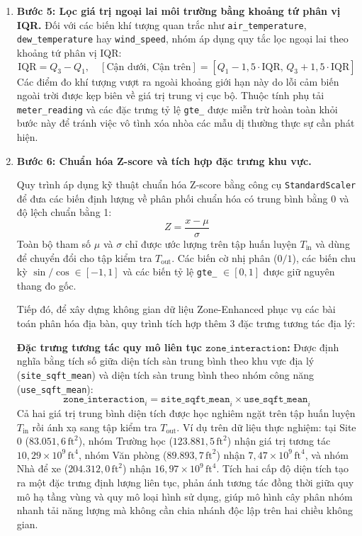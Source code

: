 \begin{enumerate}
    \item \textbf{Bước 5: Lọc giá trị ngoại lai môi trường bằng khoảng tứ phân vị IQR.}
    Đối với các biến khí tượng quan trắc như \texttt{air\_temperature}, \texttt{dew\_temperature} hay \texttt{wind\_speed}, nhóm áp dụng quy tắc lọc ngoại lai theo khoảng tứ phân vị IQR:
    \begin{equation*}
        \text{IQR} = Q_3 - Q_1, \quad [\text{Cận dưới}, \, \text{Cận trên}] = [Q_1 - 1{,}5 \cdot \text{IQR}, \, Q_3 + 1{,}5 \cdot \text{IQR}]
    \end{equation*}
    Các điểm đo khí tượng vượt ra ngoài khoảng giới hạn này do lỗi cảm biến ngoài trời được kẹp biên về giá trị trung vị cục bộ. Thuộc tính phụ tải \texttt{meter\_reading} và các đặc trưng tỷ lệ \texttt{gte\_} được miễn trừ hoàn toàn khỏi bước này để tránh việc vô tình xóa nhòa các mẫu dị thường thực sự cần phát hiện.

    \item \textbf{Bước 6: Chuẩn hóa Z-score và tích hợp đặc trưng khu vực.}
    
    Quy trình áp dụng kỹ thuật chuẩn hóa Z-score bằng công cụ \texttt{StandardScaler} để đưa các biến định lượng về phân phối chuẩn hóa có trung bình bằng 0 và độ lệch chuẩn bằng 1:
    \begin{equation*}
        Z = \frac{x - \mu}{\sigma}
    \end{equation*}
    Toàn bộ tham số $\mu$ và $\sigma$ chỉ được ước lượng trên tập huấn luyện $T_{\text{in}}$ và dùng để chuyển đổi cho tập kiểm tra $T_{\text{out}}$. Các biến cờ nhị phân ($0/1$), các biến chu kỳ $\sin/\cos \in [-1, 1]$ và các biến tỷ lệ \texttt{gte\_} $\in [0, 1]$ được giữ nguyên thang đo gốc.
    
    Tiếp đó, để xây dựng không gian dữ liệu Zone-Enhanced phục vụ các bài toán phân hóa địa bàn, quy trình tích hợp thêm 3 đặc trưng tương tác địa lý:
    
    \textbf{Đặc trưng tương tác quy mô liên tục $\texttt{zone\_interaction}$:} Được định nghĩa bằng tích số giữa diện tích sàn trung bình theo khu vực địa lý (\texttt{site\_sqft\_mean}) và diện tích sàn trung bình theo nhóm công năng (\texttt{use\_sqft\_mean}):
    \begin{equation*}
        \texttt{zone\_interaction}_i = \texttt{site\_sqft\_mean}_i \times \texttt{use\_sqft\_mean}_i
    \end{equation*}
    Cả hai giá trị trung bình diện tích được học nghiêm ngặt trên tập huấn luyện $T_{\text{in}}$ rồi ánh xạ sang tập kiểm tra $T_{\text{out}}$. Ví dụ trên dữ liệu thực nghiệm: tại Site 0 ($83.051{,}6\,\text{ft}^2$), nhóm Trường học ($123.881{,}5\,\text{ft}^2$) nhận giá trị tương tác $10{,}29 \times 10^9\,\text{ft}^4$, nhóm Văn phòng ($89.893{,}7\,\text{ft}^2$) nhận $7{,}47 \times 10^9\,\text{ft}^4$, và nhóm Nhà để xe ($204.312{,}0\,\text{ft}^2$) nhận $16{,}97 \times 10^9\,\text{ft}^4$. Tích hai cấp độ diện tích tạo ra một đặc trưng định lượng liên tục, phản ánh tương tác đồng thời giữa quy mô hạ tầng vùng và quy mô loại hình sử dụng, giúp mô hình cây phân nhóm nhanh tải năng lượng mà không cần chia nhánh độc lập trên hai chiều không gian.
    

\end{enumerate}
